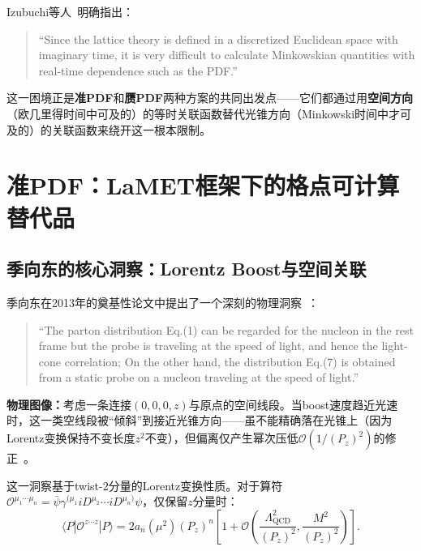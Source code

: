\documentclass[12pt,a4paper]{ctexart}
\theoremstyle{definition}
\begin{document}
Izubuchi等人~\cite{Izubuchi2018}明确指出：
\begin{quote}
``Since the lattice theory is defined in a discretized Euclidean space with imaginary time, it is very difficult to calculate Minkowskian quantities with real-time dependence such as the PDF.''
\end{quote}

这一困境正是\textbf{准PDF}和\textbf{赝PDF}两种方案的共同出发点——它们都通过用\textbf{空间方向}（欧几里得时间中可及的）的等时关联函数替代光锥方向（Minkowski时间中才可及的）的关联函数来绕开这一根本限制。

\section{准PDF：LaMET框架下的格点可计算替代品}

\subsection{季向东的核心洞察：Lorentz Boost与空间关联}

季向东在2013年的奠基性论文中提出了一个深刻的物理洞察~\cite{Ji2013Euclidean}：

\begin{quote}
``The parton distribution Eq.(1) can be regarded for the nucleon in the rest frame but the probe is traveling at the speed of light, and hence the light-cone correlation; On the other hand, the distribution Eq.(7) is obtained from a static probe on a nucleon traveling at the speed of light.''
\end{quote}

\textbf{物理图像：}考虑一条连接$(0,0,0,z)$与原点的空间线段。当boost速度趋近光速时，这一类空线段被``倾斜''到接近光锥方向——虽不能精确落在光锥上（因为Lorentz变换保持不变长度$z^2$不变），但偏离仅产生幂次压低$\mathcal{O}(1/(P_z)^2)$的修正~\cite{Ji2013Euclidean}。

这一洞察基于twist-2分量的Lorentz变换性质。对于算符$\mathcal{O}^{\mu_1\cdots\mu_n} = \bar\psi\gamma^{(\mu_1}iD^{\mu_2}\cdots iD^{\mu_n)}\psi$，仅保留$z$分量时：
\begin{equation}
\langle P | \mathcal{O}^{z\cdots z} | P \rangle = 2a_n(\mu^2)(P_z)^n \left[1 + \mathcal{O}\!\left(\frac{\Lambda_{\text{QCD}}^2}{(P_z)^2}, \frac{M^2}{(P_z)^2}\right)\right].
\label{eq:twist2_z_components}
\end{equation}
\end{document}
